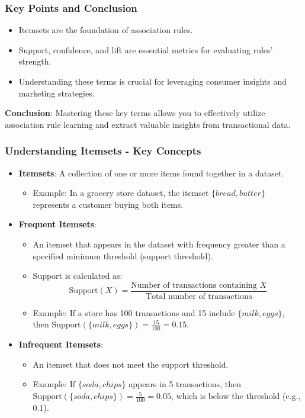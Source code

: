 \documentclass[aspectratio=169]{beamer}
\begin{document}
\begin{frame}[fragile]
    \frametitle{Key Points and Conclusion}
    \begin{itemize}
        \item Itemsets are the foundation of association rules.
        \item Support, confidence, and lift are essential metrics for evaluating rules' strength.
        \item Understanding these terms is crucial for leveraging consumer insights and marketing strategies.
    \end{itemize}
    
    \textbf{Conclusion}: Mastering these key terms allows you to effectively utilize association rule learning and extract valuable insights from transactional data.
\end{frame}

\begin{frame}[fragile]
    \frametitle{Understanding Itemsets - Key Concepts}
    \begin{itemize}
        \item \textbf{Itemsets}: A collection of one or more items found together in a dataset. 
        \begin{itemize}
            \item Example: In a grocery store dataset, the itemset $\{bread, butter\}$ represents a customer buying both items.
        \end{itemize}
        
        \item \textbf{Frequent Itemsets}: 
        \begin{itemize}
            \item An itemset that appears in the dataset with frequency greater than a specified minimum threshold (support threshold).
            \item Support is calculated as:  
            \begin{equation}
            \text{Support}(X) = \frac{\text{Number of transactions containing } X}{\text{Total number of transactions}}
            \end{equation}
            \item Example: If a store has 100 transactions and 15 include $\{milk, eggs\}$, then $\text{Support}(\{milk, eggs\}) = \frac{15}{100} = 0.15$.
        \end{itemize}
        
        \item \textbf{Infrequent Itemsets}: 
        \begin{itemize}
            \item An itemset that does not meet the support threshold.
            \item Example: If $\{soda, chips\}$ appears in 5 transactions, then $\text{Support}(\{soda, chips\}) = \frac{5}{100} = 0.05$, which is below the threshold (e.g., 0.1).
        \end{itemize}
    \end{itemize}
\end{frame}
\end{document}
